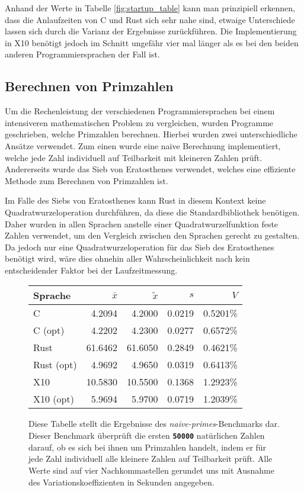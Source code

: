Anhand der Werte in Tabelle \ref{fig:startup_table} kann man prinzipiell erkennen,
dass die Anlaufzeiten von C und Rust sich sehr nahe sind, etwaige Unterschiede lassen sich durch die Varianz der
Ergebnisse zurückführen. Die Implementierung in X10 benötigt jedoch im Schnitt ungefähr vier mal länger als es bei 
den beiden anderen Programmiersprachen der Fall ist. 


\subsection{Berechnen von Primzahlen}\label{sec:primes_calc}

Um die Rechenleistung der verschiedenen Programmiersprachen bei einem intensiveren mathematischen Problem zu 
vergleichen, wurden Programme geschrieben, welche Primzahlen berechnen.
Hierbei wurden zwei unterschiedliche Ansätze verwendet. Zum einen wurde
eine naive Berechnung implementiert, welche jede Zahl individuell auf Teilbarkeit mit kleineren Zahlen prüft. 
Andererseits wurde das Sieb von Eratosthenes verwendet, welches eine effiziente Methode zum Berechnen von Primzahlen
ist.

Im Falle des Siebs von Eratosthenes kann Rust in diesem Kontext keine Quadratwurzeloperation durchführen,
da diese die Standardbibliothek benötigen. Daher wurden in allen Sprachen anstelle einer Quadratwurzelfunktion
feste Zahlen verwendet, um den Vergleich zwischen den Sprachen gerecht zu gestalten.
Da jedoch nur eine Quadratwurzeloperation für das Sieb des Eratosthenes
benötigt wird, wäre dies ohnehin aller Wahrscheinlichkeit nach kein entscheidender Faktor bei der Laufzeitmessung.

\begin{figure}[hb]
	\begin{center}
		\begin{tabular}{lrrrr}
			\toprule
			Sprache    & $\bar{x}$ & $\tilde{x}$ & $s$ & $V$   \\
			\midrule
			C          &  4.2094  &  4.2000 & 0.0219 & 0.5201\% \\
			C (opt)    &  4.2202  &  4.2300 & 0.0277 & 0.6572\% \\
			Rust       & 61.6462  & 61.6050 & 0.2849 & 0.4621\% \\
			Rust (opt) &  4.9692  &  4.9650 & 0.0319 & 0.6413\% \\
			X10        & 10.5830  & 10.5500 & 0.1368 & 1.2923\% \\
			X10 (opt)  &  5.9694  &  5.9700 & 0.0719 & 1.2039\% \\
			\bottomrule
		\end{tabular}
	\end{center}
	\caption{
		Diese Tabelle stellt die Ergebnisse des \textit{naive-primes}-Benchmarks dar.
		Dieser Benchmark überprüft die ersten \texttt{\textsc{\textbf{50000}}} natürlichen Zahlen darauf,
		ob es sich bei ihnen um Primzahlen handelt,
		indem er für jede Zahl individuell alle kleinere Zahlen auf Teilbarkeit prüft.
		Alle Werte sind auf vier Nachkommastellen gerundet uns mit Ausnahme des Variationskoeffizienten
		in Sekunden angegeben.
	}
	\label{fig:primes_naive_table}
\end{figure}


